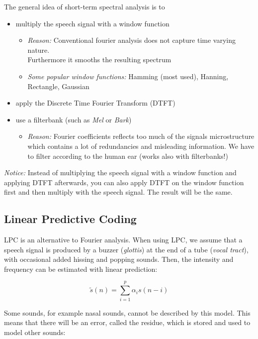 \documentclass[11pt]{article}
\begin{document}
The general idea of short-term spectral analysis is to

\begin{itemize}
    \item multiply the speech signal with a window function
    \begin{itemize}
    \item \emph{Reason:} Conventional fourier analysis does not capture time varying nature. \\ Furthermore it smooths the resulting spectrum
    \item \emph{Some popular window functions:} Hamming (most used), Hanning, Rectangle, Gaussian
    \end{itemize}

    \item apply the Discrete Time Fourier Transform (DTFT)
    \item use a filterbank (such as \textit{Mel} or \textit{Bark})
    \begin{itemize}
    \item \emph{Reason:} Fourier coefficients reflects too much of the signals microstructure which contains a lot of redundancies and misleading information. We have to filter according to the human ear (works also with filterbanks!)
    \end{itemize}

\end{itemize}

\emph{Notice:} Instead of multiplying the speech signal with a window function and applying DTFT afterwards, you can also apply DTFT on the window function first and then multiply with the speech signal. The result will be the same.
\subsection{Linear Predictive Coding}

LPC is an alternative to Fourier analysis. When using LPC, we assume that a speech signal is produced by a buzzer (\textit{glottis}) at the end of a tube (\textit{vocal tract}), with occasional added hissing and popping sounds. Then, the intensity and frequency can be estimated with linear prediction:

\begin{equation}
    \tilde{s}(n) = \sum\limits_{i = 1}^p \alpha_i s(n - i)
\end{equation}

Some sounds, for example nasal sounds, cannot be described by this model. This means that there will be an error, called the residue, which is stored and used to model other sounds:
\end{document}
